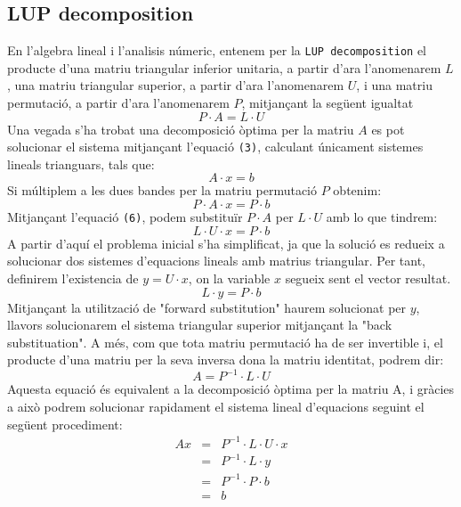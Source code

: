 \documentclass{article}
\begin{document}
\subsection{LUP decomposition}
    En l'algebra lineal i l'analisis númeric, entenem per la \texttt{LUP decomposition} el producte d'una matriu triangular inferior unitaria, a partir d'ara l'anomenarem $L$, una matriu triangular superior, a partir d'ara l'anomenarem $U$, i una matriu permutació, a partir d'ara l'anomenarem $P$, mitjançant la següent igualtat
    \begin{equation}
        P \cdot A = L \cdot U
    \end{equation}
    Una vegada s'ha trobat una decomposició òptima per la matriu $A$ es pot solucionar el sistema mitjançant l'equació \texttt{(3)}, calculant únicament sistemes lineals trianguars, tals que:
    \begin{equation*}
        A \cdot x = b
    \end{equation*}
    Si múltiplem a les dues bandes per la matriu permutació $P$ obtenim:
    \begin{equation*}
        P \cdot A \cdot x = P \cdot b
    \end{equation*}
    Mitjançant l'equació \texttt{(6)}, podem substituïr $P \cdot A$ per $L \cdot U$ amb lo que tindrem:
    \begin{equation*}
        L \cdot U \cdot x = P \cdot b
    \end{equation*}
    A partir d'aquí el problema inicial s'ha simplificat, ja que la solució es redueix a solucionar dos sistemes d'equacions lineals amb matrius triangular. Per tant, definirem l'existencia de $y = U \cdot x$, on la variable $x$ segueix sent el vector resultat.
    \begin{equation*}
        L \cdot y = P \cdot b
    \end{equation*}
    Mitjançant la utilització de "forward substitution" haurem solucionat per $y$, llavors solucionarem el sistema triangular superior mitjançant la "back substituation". A més, com que tota matriu permutació ha de ser invertible i, el producte d'una matriu per la seva inversa dona la matriu identitat, podrem dir:
    \begin{equation*}
        A = P^{-1} \cdot L \cdot U
    \end{equation*}
    Aquesta equació és equivalent a la decomposició òptima per la matriu A, i gràcies a això podrem solucionar rapidament el sistema lineal d'equacions seguint el següent procediment:
    \begin{equation}
        \begin{matrix}
            Ax & = & P^{-1} \cdot L \cdot U \cdot x \\
            & = & P^{-1} \cdot L \cdot y \\ 
            & = & P^{-1} \cdot P \cdot b \\
            & = & b
        \end{matrix}
    \end{equation}
    
\end{document}
